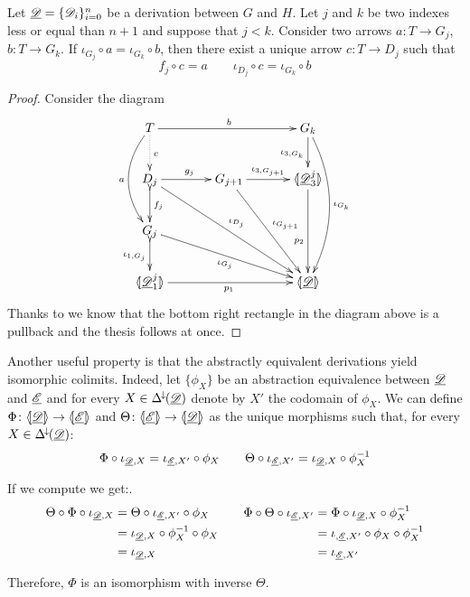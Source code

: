 \begin{corollary}\label{cor:ele}
	Let $\underline{\mathscr{D}}=\{\mathscr{D}_{i}\}_{i=0}^n$ be a derivation between $G$ and $H$. Let $j$ and $k$ be two indexes less or equal than $n+1$ and suppose that $j< k$.  Consider two arrows $a\colon T\to G_j$, $b\colon T\to G_k$. If $\iota_{G_j}\circ a = \iota_{G_k}\circ b$, 
	then  there exist a unique arrow $c\colon T\to D_j $  such that \[f_j\circ c = a\qquad \iota_{D_j}\circ c =\iota_{G_k}\circ b\]
	\end{corollary}
\begin{proof} Consider the diagram
			\[\xymatrix@C=34pt{T  \ar@/_.6cm/[dd]_{a}\ar@{.>}[d]^{c}\ar[rr]^{b}&& G_k \ar[d]_{\iota_{3, G_k}} \ar@/^.6cm/[ddd]^{\iota_{G_k}}\\D_{j} \ar[r]^{g_j} \ar[ddrr]^{\iota_{D_j}}\ar@{>->}[d]^{f_j}& G_{j+1} \ar[r]^-{\iota_{3,G_{j+1}}} \ar[ddr]^{\iota_{G_{j+1}}} & \lpro \der{D}^j_3\rpro \ar[dd]_(.6){p_2} \\ G_j \ar@{>->}[d]_{\iota_{1,G_j}} \ar[drr]_{\iota_{G_j}}\\ \lpro \der{D}^j_1 \rpro \ar[rr]_{p_1}  &&\tpro{D} }\] 
			Thanks to  we know that the bottom right rectangle in the diagram above is a pullback and the thesis follows at once.
\end{proof}

\begin{remark}\label{rem:abscol}
Another useful property is that the abstractly equivalent derivations yield isomorphic colimits. Indeed, let $\{\phi_X\}$ be an abstraction equivalence between $\underline{\mathscr{D}}$ and $\underline{\mathscr{E}}$ and for every $X\in \Delta^{\hspace{-1pt}\downarrow\hspace{-1pt}}(\underline{\mathscr{D}})$ denote by $X'$ the codomain of $\phi_X$. We can define $\Phi \colon \langle \hspace{-1.85pt}[ \underline{\mathscr{D}}]\hspace{-1.85pt}\rangle\to \langle \hspace{-1.85pt}[ \underline{\mathscr{E}}]\hspace{-1.85pt}\rangle$ and $\Theta \colon \langle \hspace{-1.85pt}[\underline{\mathscr{E}}]\hspace{-1.85pt}\rangle \to \langle \hspace{-1.85pt}[ \underline{\mathscr{D}}]\hspace{-1.85pt}\rangle$ as the unique morphisms such that, for every $X\in \Delta^{\hspace{-1pt}\downarrow\hspace{-1pt}}(\underline{\mathscr{D}})$:
\[\Phi \circ \iota_{\underline{\mathscr{D}},X}= \iota_{\underline{\mathscr{E}}, X'}\circ \phi_X \qquad \Theta \circ \iota_{\underline{\mathscr{E}}, X'}= \iota_{\underline{\mathscr{D}}, X}\circ \phi^{-1}_X \]

If we compute we get:.
\[\begin{split}
	\Theta \circ \Phi \circ \iota_{\underline{\mathscr{D}}, X}&=\Theta \circ\iota_{\underline{\mathscr{E}}, X'}\circ \phi_X\\&=\iota_{\underline{\mathscr{D}}, X}\circ \phi^{-1}_X\circ \phi_X\\&=\iota_{\underline{\mathscr{D}}, X} 
\end{split}\qquad \begin{split}
	\Phi \circ \Theta \circ \iota_{\underline{\mathscr{E}}, X'}&=\Phi \circ \iota_{\underline{\mathscr{D}}, X}\circ \phi^{-1}_{X}\\&=\iota_{, \underline{\mathscr{E}}, X'}\circ \phi_X\circ \phi^{-1}_{X}\\&=\iota_{\underline{\mathscr{E}},X'}
\end{split}\]

Therefore, $\Phi$ is an isomorphism with inverse $\Theta$.
\end{remark}

